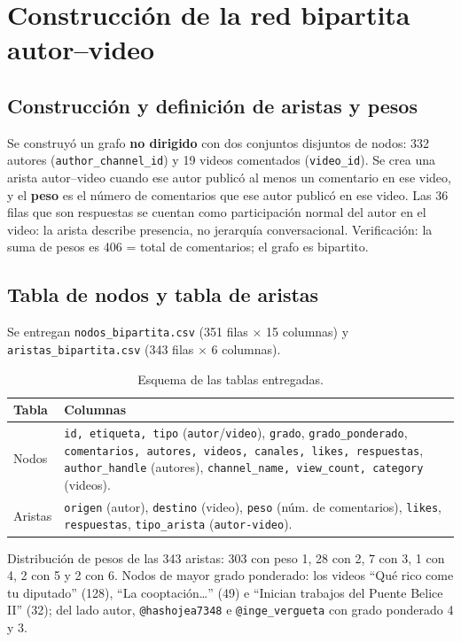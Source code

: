 \documentclass[11pt,a4paper]{article}
\begin{document}
\section{Construcci\'on de la red bipartita autor--video}

\subsection{Construcci\'on y definici\'on de aristas y pesos}
Se construy\'o un grafo \textbf{no dirigido} con dos conjuntos disjuntos de nodos: 332 autores
(\texttt{author\_channel\_id}) y 19 videos comentados (\texttt{video\_id}). Se crea una arista
autor--video cuando ese autor public\'o al menos un comentario en ese video, y el \textbf{peso} es el
n\'umero de comentarios que ese autor public\'o en ese video. Las 36 filas que son respuestas se
cuentan como participaci\'on normal del autor en el video: la arista describe presencia, no jerarqu\'ia
conversacional. Verificaci\'on: la suma de pesos es 406 = total de comentarios; el grafo es bipartito.

\subsection{Tabla de nodos y tabla de aristas}
Se entregan \texttt{nodos\_bipartita.csv} (351 filas $\times$ 15 columnas) y
\texttt{aristas\_bipartita.csv} (343 filas $\times$ 6 columnas).

\begin{table}[H]
\centering
\caption{Esquema de las tablas entregadas.}
\begin{tabular}{l p{11.2cm}}
\toprule
Tabla & Columnas \\
\midrule
Nodos & \texttt{id, etiqueta, tipo} (\texttt{autor}/\texttt{video}), \texttt{grado},
  \texttt{grado\_ponderado}, \texttt{comentarios, autores, videos, canales, likes, respuestas},
  \texttt{author\_handle} (autores), \texttt{channel\_name, view\_count, category} (videos). \\
Aristas & \texttt{origen} (autor), \texttt{destino} (video), \texttt{peso} (n\'um. de comentarios),
  \texttt{likes}, \texttt{respuestas}, \texttt{tipo\_arista} (\texttt{autor-video}). \\
\bottomrule
\end{tabular}
\end{table}

Distribuci\'on de pesos de las 343 aristas: 303 con peso 1, 28 con 2, 7 con 3, 1 con 4, 2 con 5 y
2 con 6. Nodos de mayor grado ponderado: los videos ``Qu\'e rico come tu diputado'' (128),
``La cooptaci\'on\dots'' (49) e ``Inician trabajos del Puente Belice II'' (32); del lado autor,
\texttt{@hashojea7348} e \texttt{@inge\_vergueta} con grado ponderado 4 y 3.
\end{document}
